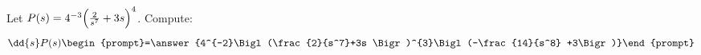 \documentclass{ximera}
\author{Bart Snapp\and Nela lakos}
\begin{document}
\begin{exercise}
Let $P(s) =4^{-3}\Bigl(\frac{2}{s^7}+3s \Bigr)^{4}$. Compute:
\[
\dd{s}P(s)
\begin{prompt}=\answer{4^{-2}\Bigl(\frac{2}{s^7}+3s \Bigr)^{3}\Bigl(-\frac{14}{s^8} +3\Bigr)}\end{prompt}
\]
\end{exercise}
\end{document}
